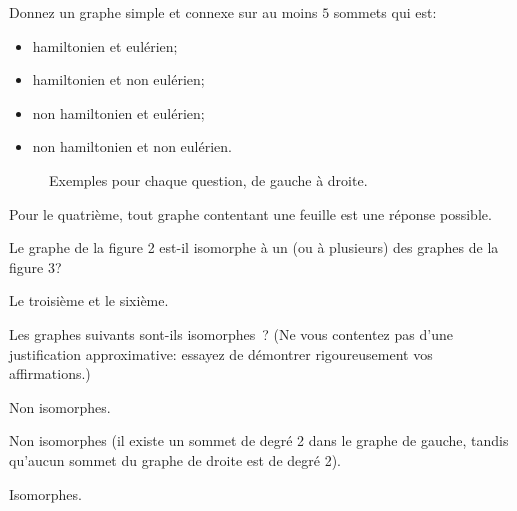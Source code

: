 
\begin{exo}
Donnez un graphe simple et connexe sur au moins $5$ sommets qui est:
\begin{itemize}
\item hamiltonien et eul\'erien;
\item hamiltonien et non eul\'erien;
\item non hamiltonien et eul\'erien;
\item non hamiltonien et non eul\'erien.
\end{itemize}
\end{exo}

\begin{figure}[!h]
\centering

\caption{Exemples pour chaque question, de gauche à droite.}
\end{figure}

Pour le quatrième, tout graphe contentant une feuille est une réponse possible.

\newpage

\begin{exo}
Le graphe de la figure 2 est-il isomorphe \`a un (ou \`a plusieurs) des graphes de la figure 3?
\end{exo}

\begin{figure}[!h]
\centering
\scalebox{.825}{}
\caption{}
\end{figure}

\begin{figure}[!h]
\scalebox{.825}{}
\caption{}
\end{figure}

Le troisième et le sixième.


\begin{exo}
Les graphes suivants sont-ils isomorphes~? (Ne vous contentez pas d'une justification approximative: essayez de d\'emontrer rigoureusement vos affirmations.)
\end{exo}

\begin{figure}[!h]
\centering

\caption{}
\end{figure}%

Non isomorphes. 

\begin{figure}[!h]
\centering

\caption{}
\end{figure}

Non isomorphes (il existe un sommet de degré 2 dans le graphe de gauche, tandis qu'aucun sommet du graphe de droite est de degré 2).

\begin{figure}[!h]
\centering

\caption{}
\end{figure}

Isomorphes.